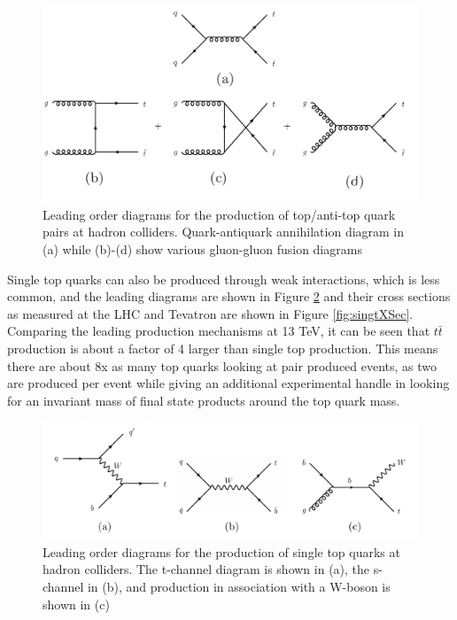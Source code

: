 \begin{figure}[h!]
	\centering
	\includegraphics[width=\columnwidth]{../ThesisImages/Theory/LOPairProdDiags.png}
	\caption[Leading order diagrams for $t\bar{t}$ production at hadron colliders]{Leading order diagrams for the production of top/anti-top quark pairs at hadron colliders.  Quark-antiquark annihilation diagram in (a) while (b)-(d) show various gluon-gluon fusion diagrams}
	\label{fig:LOprod}
\end{figure}

Single top quarks can also be produced through weak interactions, which is less common, and the leading diagrams are shown in Figure \ref{fig:LOprodSing} and their cross sections as measured at the LHC and Tevatron are shown in Figure \ref{fig:singtXSec}.  Comparing the leading production mechanisms at 13 TeV, it can be seen that $t\bar{t}$ production is about a factor of 4 larger than single top production.  This means there are about 8x as many top quarks looking at pair produced events, as two are produced per event while giving an additional experimental handle in looking for an invariant mass of final state products around the top quark mass.

\begin{figure}[h!]
	\centering
	\includegraphics[width=\columnwidth]{../ThesisImages/Theory/LOSingProdDiags.png}
	\caption[Leading order diagrams for single top quark production]{Leading order diagrams for the production of single top quarks at hadron colliders.  The t-channel diagram is shown in (a), the s-channel in (b), and production in association with a W-boson is shown in (c)}
	\label{fig:LOprodSing}
\end{figure}

